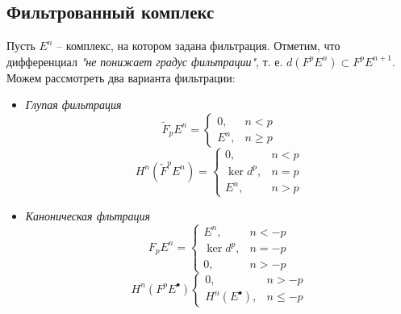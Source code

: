 \documentclass[../main.tex]{subfiles}
\begin{document}
\subsection{Фильтрованный комплекс}
Пусть $E^n$  -- комплекс, на котором задана фильтрация. Отметим, что дифференциал \textit{"не понижает градус фильтрации"}, т. е.  $d(F^pE^n)\subset F^p E^{n+1}$. Можем рассмотреть два варианта фильтрации:
\begin{itemize}
\item \textit{Глупая фильтрация}
\[
\widetilde{F}_p E^n = \begin{cases} 0, &n < p \\ E^n, & n \ge p \end{cases}
\]
\[
H^n(\widetilde{F}^p E^n) = \begin{cases} 0, &n < p\\ \ker d^p, & n=p \\ E^n, & n > p \end{cases}
\]
\bee
{}
\eee
\item \textit{Каноническая фльтрация}
\[
F_p E^n = \begin{cases} E^n, &n < -p \\ \ker d^p, & n = -p \\ 0, & n>-p \end{cases}
\]
\[
H^n (F^p E^\bullet) \begin{cases} 0, &n > -p \\ H^n(E^\bullet), & n\le-p \end{cases}
\]
\bee
{}
\eee
\end{itemize}
\begin{to_ex}
\end{to_ex}
\end{document}
